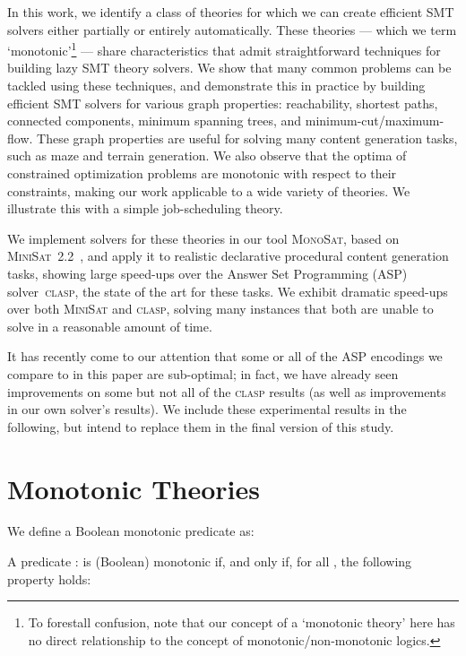 \documentclass[runningheads]{llncs}
\newcommand{\algformat}[1]{\textsc{#1}\xspace}
\newcommand{\minisat}{\algformat{MiniSat}}
\newcommand{\monosat}{\algformat{MonoSat}}
\newcommand{\clasp}{\algformat{clasp}}
\begin{document}
In this work,  we identify a class of theories for which we can create
efficient SMT solvers either partially or entirely automatically. These
theories --- which we term `monotonic'\footnote{To forestall confusion,
note that our concept of a `monotonic theory' here has no direct
relationship to the concept of monotonic/non-monotonic logics.} ---
share
characteristics that admit straightforward techniques
for building lazy SMT theory solvers.
We show that many common problems
can be tackled using these techniques, and demonstrate this in practice
by building efficient SMT solvers for various graph properties:
reachability, shortest paths, connected components, minimum spanning
trees, and minimum-cut/maximum-flow. These graph properties are useful
for solving many content generation tasks, such as maze and
terrain generation.
We also observe that the optima of constrained optimization problems
are monotonic with respect to their constraints, making our work
applicable to a wide variety of theories.
We illustrate this with a simple job-scheduling theory.

We implement solvers for these theories in our tool \monosat,
based on \minisat~2.2~\cite{een2004extensible}, and apply it
to realistic declarative procedural content generation tasks,
showing large speed-ups over the Answer Set Programming (ASP)
solver~\clasp\cite{gebser2007clasp}, the state of the art for these tasks. We
exhibit dramatic speed-ups over both \minisat and \clasp, solving many instances that both are unable to solve
in a reasonable amount of time. 

It has recently come to our attention that some or all of the ASP encodings we compare to 
in this paper are sub-optimal; in fact, we have already seen improvements on some but not all of the \clasp results (as well as improvements in our own solver's results). We include these experimental results in the following, but intend to replace them in the final version 
of this study.


\section{Monotonic Theories\label{sec:smmt}}



We define a Boolean monotonic predicate as:

\begin{definition}
A predicate  :  is (Boolean) monotonic if, and only if,  for all , the following property holds:

\end{definition}
\end{document}

